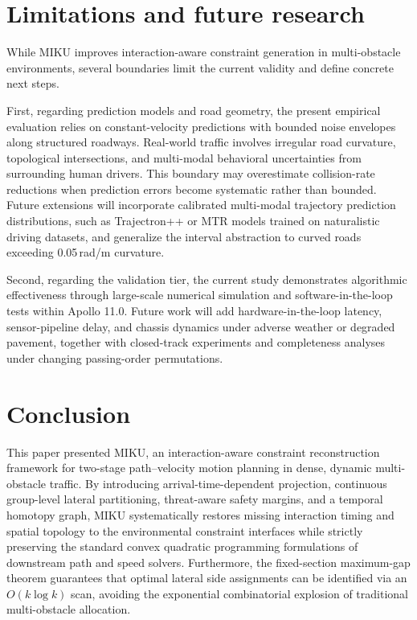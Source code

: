 \section{Limitations and future research}
\label{sec:limitations}

While MIKU improves interaction-aware constraint generation in multi-obstacle environments, several boundaries limit the current validity and define concrete next steps.

First, regarding prediction models and road geometry, the present empirical evaluation relies on constant-velocity predictions with bounded noise envelopes along structured roadways. Real-world traffic involves irregular road curvature, topological intersections, and multi-modal behavioral uncertainties from surrounding human drivers. This boundary may overestimate collision-rate reductions when prediction errors become systematic rather than bounded. Future extensions will incorporate calibrated multi-modal trajectory prediction distributions, such as Trajectron++ or MTR models trained on naturalistic driving datasets, and generalize the interval abstraction to curved roads exceeding 0.05\,rad/m curvature.

Second, regarding the validation tier, the current study demonstrates algorithmic effectiveness through large-scale numerical simulation and software-in-the-loop tests within Apollo 11.0. Future work will add hardware-in-the-loop latency, sensor-pipeline delay, and chassis dynamics under adverse weather or degraded pavement, together with closed-track experiments and completeness analyses under changing passing-order permutations.

\section{Conclusion}
\label{sec:conclusion}

This paper presented MIKU, an interaction-aware constraint reconstruction framework for two-stage path--velocity motion planning in dense, dynamic multi-obstacle traffic. By introducing arrival-time-dependent projection, continuous group-level lateral partitioning, threat-aware safety margins, and a temporal homotopy graph, MIKU systematically restores missing interaction timing and spatial topology to the environmental constraint interfaces while strictly preserving the standard convex quadratic programming formulations of downstream path and speed solvers. Furthermore, the fixed-section maximum-gap theorem guarantees that optimal lateral side assignments can be identified via an $O(k\log k)$ scan, avoiding the exponential combinatorial explosion of traditional multi-obstacle allocation.

